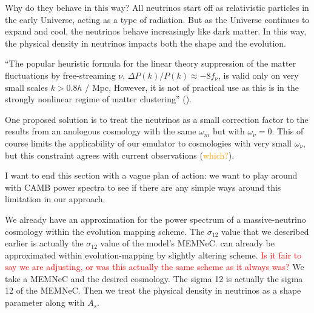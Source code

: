 Why do they behave in this way? All neutrinos start off as
relativistic particles in the early Universe, acting as a type of radiation.
But as the Universe continues to expand and cool, the neutrinos behave
increasingly like dark matter.
In this way, the physical density in neutrinos impacts both the shape and the
evolution.

``The popular heuristic formula for the linear theory suppression of the matter
fluctuations by free-streaming $\nu$, $\Delta P(k) / P(k) \approx -8 f_\nu$, is
valid only on very small scales $k > 0.8 h$ / Mpc, However, it is not of
practical use as this is in the strongly nonlinear regime of matter
clustering'' ().

One proposed solution is to treat the neutrinos as a small correction factor
to the results from an anologous cosmology with the same $\omega_m$ but with
$\omega_\nu = 0$. This of course limits the applicability of our emulator to
cosmologies with very small $\omega_\nu$, but this constraint agrees with
current observations (\textcolor{orange}{which?}).

I want to end this section with a vague plan of action: we want to play around with CAMB power spectra to see if there are any simple ways around this limitation in our approach.



We already have an approximation for the power spectrum of a massive-neutrino cosmology within the evolution mapping scheme. The $\sigma_{12}$ value that we described earlier is actually the $\sigma_{12}$ value of the model's MEMNeC. can already be approximated within evolution-mapping by slightly altering scheme. \textcolor{red}{Is it fair to say we are adjusting, or was this actually the same scheme as it always was?} We take a MEMNeC and the desired cosmology. The sigma 12 is actually the sigma 12 of the MEMNeC. Then we treat the physical density in neutrinos as a shape parameter along with $A_s$.
